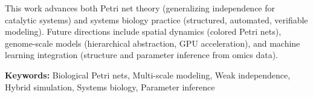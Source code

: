 This work advances both Petri net theory (generalizing independence for catalytic systems) and systems biology practice (structured, automated, verifiable modeling). Future directions include spatial dynamics (colored Petri nets), genome-scale models (hierarchical abstraction, GPU acceleration), and machine learning integration (structure and parameter inference from omics data).

\vspace{1cm}
\noindent\textbf{Keywords:} Biological Petri nets, Multi-scale modeling, Weak independence, Hybrid simulation, Systems biology, Parameter inference
